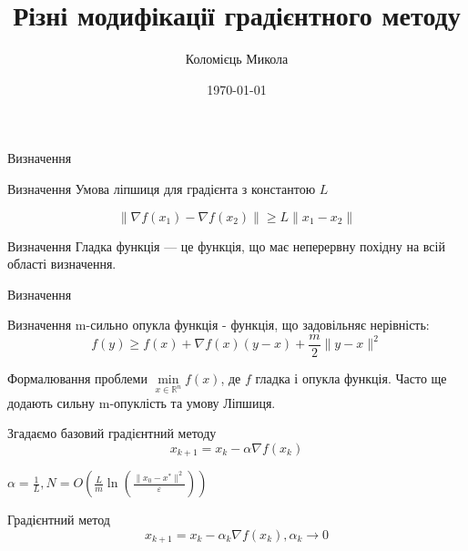 \documentclass[a4paper, 14pt]{beamer}
\title{Різні модифікації градієнтного методу}
\author{Коломієць Микола}
\date{\today}
\begin{document}
\maketitle

\begin{frame}{Визначення}

    \begin{statement}{Визначення}
        Умова ліпшиця для градієнта з константою $L$

        $$\| \nabla f(x_1) - \nabla f(x_2) \| \geq L \|x_1 - x_2 \| $$
    \end{statement}
    
    \begin{statement}{Визначення}
        Гладка функція — це функція, що має неперервну похідну 
        на всій області визначення.
    \end{statement}

\end{frame}

\begin{frame}{Визначення}
    \begin{statement}{Визначення}
        m-сильно опукла функція - функція, що задовільняє нерівність:
        $$ f(y) \geq f(x) + \nabla f(x) (y - x) + \frac{m}{2}\|y - x\|^2 $$
    \end{statement}
\end{frame}

\begin{frame}{Формалювання проблеми}
    $\min\limits_{x \in \mathbb{R}^n}f(x)$, 
    де $f$ гладка і опукла функція. 
    Часто ще додають сильну m-опуклість та умову Ліпшиця. 


    Згадаємо базовий градієнтний методу
    $$x_{k+1} = x_k -\alpha \nabla f(x_k)$$

    $\alpha = \frac{1}{L}, N = O(\frac{L}{m}
    \ln(\frac{\|x_0 - x^*\|^2}{\varepsilon}))$
\end{frame}

\begin{frame}{Градієнтний метод}
    $$x_{k+1} = x_k - \alpha_k \nabla f(x_k), \alpha_k \rightarrow 0$$
\end{frame}
\end{document}
